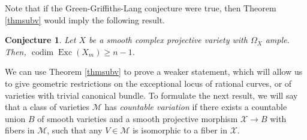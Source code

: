 \documentclass[JEP,XML,SOM,Unicode, NoEqCountersInSection,NoFloatCountersInSection,published]{cedram}
\let\mathcal\mathscr
\DeclareMathOperator{\codim}{codim}
\DeclareMathOperator{\Exc}{Exc}
\theoremstyle{theorem}
\newtheorem{conjecture}[proposition]{Conjecture}
\theoremstyle{definition}
\begin{document}
Note that if the Green-Griffiths-Lang conjecture were true, then Theorem \ref{thmsubv} would imply the following result.

\begin{conjecture}
Let $X$ be a smooth complex projective variety with $\Omega_X$ ample. Then, $\codim\Exc(X_m) \geq n - 1$.
\end{conjecture}

We can use Theorem \ref{thmsubv} to prove a weaker statement, which will allow us to give geometric restrictions on the exceptional locus of rational curves, or of varieties with trivial canonical bundle. To formulate the next result, we will say that a class of varieties \(\mathcal{M}\) has \emph{countable variation} if there exists a countable union \(B\) of smooth varieties and a smooth projective morphism \(\mathcal{X} \to B\) with fibers in \(\mathcal{M}\), such that any \(V \in \mathcal{M}\) is isomorphic to a fiber in \(\mathcal{X}\).
\end{document}
